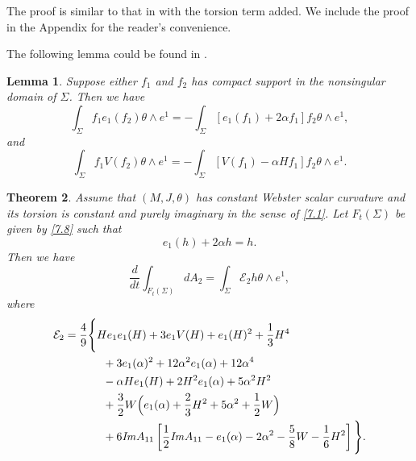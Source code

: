 \documentclass{amsart}
\newtheorem{theorem}{Theorem}[section]
\newtheorem{lem}[theorem]{Lemma}
\theoremstyle{Corollary}
\numberwithin{equation}{section}
\begin{document}
The proof is similar to that in \cite[Section 3.2, Lemma 6]{CYZ}
 with the torsion term added. We
include the proof in the Appendix for the reader's convenience.

The following lemma could be found in \cite[Section 3.2, Lemma 7]{CYZ}. 

\begin{lem}\label{lem7.4}
Suppose either $f_1$ and $f_2$ has compact support in the nonsingular domain of $\Sigma$. 
Then we have 
\begin{equation*}
\int_\Sigma f_1 e_1(f_2)\theta\wedge e^1=-\int_\Sigma[e_1(f_1)+2\alpha f_1]f_2\theta\wedge e^1,
\end{equation*}
and 
\begin{equation*}
\int_\Sigma f_1 V(f_2)\theta\wedge e^1=-\int_\Sigma[V(f_1)-\alpha Hf_1]f_2\theta\wedge e^1.
\end{equation*}
\end{lem}




\begin{theorem}\label{thm7.1}
Assume that $(M,J,\theta)$ has constant Webster scalar curvature and 
its torsion is constant and purely imaginary in the sense of \eqref{7.1}. 
Let $F_t(\Sigma)$ be given by \eqref{7.8} such that 
\begin{equation}\label{condition}
e_1(h)+2\alpha h=h.
\end{equation}
Then we have 
\begin{equation}\label{7.33}
\frac{d}{dt}\int_{F_t(\Sigma)}dA_2
=\int_\Sigma\mathcal{E}_2 h\theta\wedge e^1,
\end{equation}
where 
\begin{align}\label{7.34}
\begin{split}
\mathcal{E}_2&=\frac{4}{9}\Bigg\{He_1e_1(H)+3e_1V(H)+e_1(H)^2+\frac{1}{3}H^4\\
&\hspace{12mm}+3e_1(\alpha)^2+12\alpha^2e_1(\alpha)+12\alpha^4\\
&\hspace{12mm}-\alpha He_1(H)+2H^2 e_1(\alpha)+5\alpha^2H^2\\
&\hspace{12mm}+\frac{3}{2} W\Big(e_1(\alpha)+\frac{2}{3}H^2+5\alpha^2+\frac{1}{2}W\Big)\\
&\hspace{12mm}+6\mbox{\emph{Im}}A_{11}\left[\frac{1}{2}\mbox{\emph{Im}}A_{11}-e_1(\alpha)-2\alpha^2-\frac{5}{8}W-\frac{1}{6}H^2\right]\Bigg\}.
\end{split}
\end{align}
\end{theorem}
\end{document}
